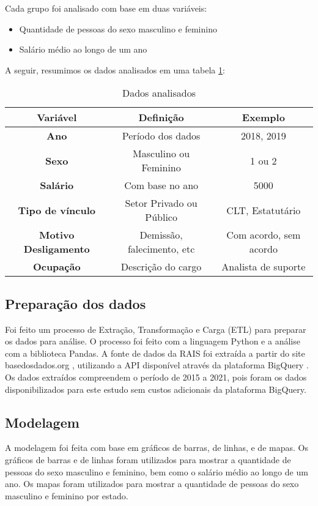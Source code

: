 Cada grupo foi analisado com base em duas variáveis:

\begin{itemize}
	\item Quantidade de pessoas do sexo masculino e feminino	      	      	      	      	      
	\item Salário médio ao longo de um ano	    
\end{itemize}
	      	      	      
A seguir, resumimos os dados analisados em uma tabela \ref{vars}:     

\begin{table}[htbp]
	\caption{Dados analisados}
	\begin{center}
		\begin{tabular}{|c|c|c|}
			\hline
			\textbf{Variável}           & \textbf{Definição}        & \textbf{Exemplo}       \\ 
			\hline 
			\textbf{Ano}                 & Período dos dados          & 2018, 2019             \\
			\hline
			\textbf{Sexo}                & Masculino ou Feminino       & 1 ou 2                 \\
			\hline
			\textbf{Salário}            & Com base no ano             & 5000                   \\
			\hline 
			\textbf{Tipo de vínculo}    & Setor Privado ou Público   & CLT, Estatutário      \\
			\hline 
			\textbf{Motivo Desligamento} & Demissão, falecimento, etc & Com acordo, sem acordo \\
			\hline
			\textbf{Ocupação}          & Descrição do cargo        & Analista de suporte    \\
			\hline 
		\end{tabular}
		\label{vars}
	\end{center} 
\end{table}      	      

\subsection{Preparação dos dados}

Foi feito um processo de Extração, Transformação e Carga (ETL) para preparar os dados para análise. O processo foi feito com a linguagem Python e a análise com a biblioteca Pandas. A fonte de dados da RAIS foi extraída a partir do site basedosdados.org \cite{basedosdados}, utilizando a API disponível através da plataforma BigQuery \cite{bigquery}. Os dados extraídos compreendem o período de 2015 a 2021, pois foram os dados disponibilizados para este estudo sem custos adicionais da plataforma BigQuery. 

\subsection{Modelagem}

A modelagem foi feita com base em gráficos de barras, de linhas, e de mapas. Os gráficos de barras e de linhas foram utilizados para mostrar a quantidade de pessoas do sexo masculino e feminino, bem como o salário médio ao longo de um ano. Os mapas foram utilizados para mostrar a quantidade de pessoas do sexo masculino e feminino por estado.